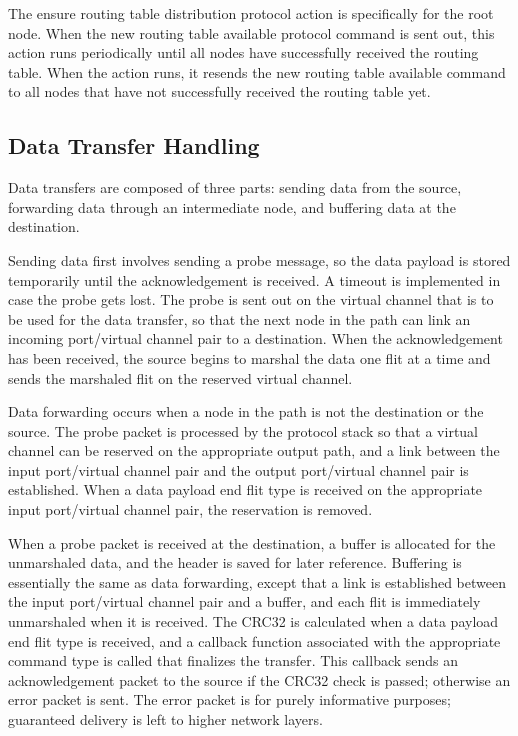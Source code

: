 The ensure routing table distribution protocol action is specifically for the root node. When the new routing table available protocol command is sent out, this action runs periodically until all nodes have successfully received the routing table. When the action runs, it resends the new routing table available command to all nodes that have not successfully received the routing table yet.

\subsection{Data Transfer Handling}\label{sec:protocol:implementation:data_transfers}

Data transfers are composed of three parts: sending data from the source, forwarding data through an intermediate node, and buffering data at the destination. 

Sending data first involves sending a probe message, so the data payload is stored temporarily until the acknowledgement is received. A timeout is implemented in case the probe gets lost. The probe is sent out on the virtual channel that is to be used for the data transfer, so that the next node in the path can link an incoming port/virtual channel pair to a destination. When the acknowledgement has been received, the source begins to marshal the data one flit at a time and sends the marshaled flit on the reserved virtual channel.

Data forwarding occurs when a node in the path is not the destination or the source. The probe packet is processed by the protocol stack so that a virtual channel can be reserved on the appropriate output path, and a link between the input port/virtual channel pair and the output port/virtual channel pair is established. When a data payload end flit type is received on the appropriate input port/virtual channel pair, the reservation is removed.

When a probe packet is received at the destination, a buffer is allocated for the unmarshaled data, and the header is saved for later reference. Buffering is essentially the same as data forwarding, except that a link is established between the input port/virtual channel pair and a buffer, and each flit is immediately unmarshaled when it is received. The CRC32 is calculated when a data payload end flit type is received, and a callback function associated with the appropriate command type is called that finalizes the transfer. This callback sends an acknowledgement packet to the source if the CRC32 check is passed; otherwise an error packet is sent. The error packet is for purely informative purposes; guaranteed delivery is left to higher network layers.


